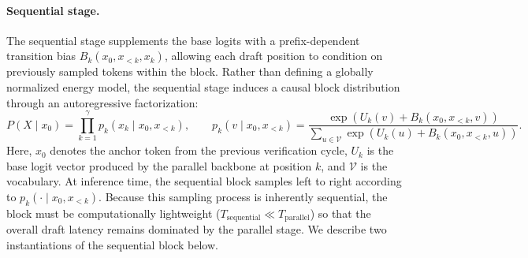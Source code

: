 \paragraph{Sequential stage.}
The sequential stage supplements the base logits with a prefix-dependent transition bias
$B_k(x_0, x_{<k}, x_k)$, allowing each draft position to condition on previously sampled
tokens within the block. Rather than defining a globally normalized energy model, the
sequential stage induces a causal block distribution through an autoregressive
factorization:
\begin{equation}
P(X \mid x_0)
=
\prod_{k=1}^{\gamma}
p_k(x_k \mid x_0, x_{<k}),
\qquad
p_k(v \mid x_0, x_{<k})
=
\frac{
\exp\!\left(U_k(v) + B_k(x_0, x_{<k}, v)\right)
}{
\sum_{u \in \mathcal{V}}
\exp\!\left(U_k(u) + B_k(x_0, x_{<k}, u)\right)
}.
\label{eq:sequential-factorization}
\end{equation}
Here, $x_0$ denotes the anchor token from the previous verification cycle, $U_k$ is the
base logit vector produced by the parallel backbone at position $k$, and $\mathcal{V}$ is the
vocabulary. At inference time, the sequential block samples left to right according to
$p_k(\cdot \mid x_0, x_{<k})$.
Because this sampling process is inherently sequential, the block must be computationally
lightweight ($T_{\text{sequential}} \ll T_{\text{parallel}}$) so that the overall draft latency
remains dominated by the parallel stage.
We describe two instantiations of the sequential block below.


